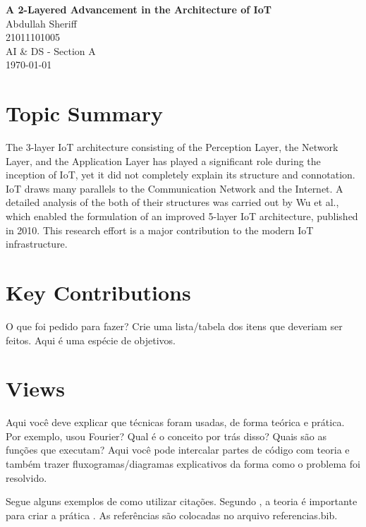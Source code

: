 \documentclass[12pt,a4paper, india]{article}
\begin{document}
\begin{center}
{\textbf {\huge A 2-Layered Advancement in the Architecture of IoT}}\\[5mm]
{\large Abdullah Sheriff} \\[1mm]
{\large 21011101005} \\[1mm]
{\large AI \& DS - Section A} \\[5mm]

\today\\[5mm] %
\end{center}


\section{Topic Summary}

The 3-layer IoT architecture consisting of the Perception Layer, the Network Layer, and the Application Layer has played a significant role during the inception of IoT, yet it did not completely explain its structure and connotation. 
	IoT draws many parallels to the Communication Network and the Internet. A detailed analysis of the both of their structures was carried out by Wu et al., which enabled the formulation of an improved 5-layer IoT architecture, published in 2010.
	This research effort is a major contribution to the modern IoT infrastructure.

\section{Key Contributions}

O que foi pedido para fazer? Crie uma lista/tabela dos itens que deveriam ser feitos. Aqui é uma espécie de objetivos.

\section{Views}

Aqui você deve explicar que técnicas foram usadas, de forma teórica e prática. Por exemplo, usou Fourier? Qual é o conceito por trás disso? Quais são as funções que executam? Aqui você pode intercalar partes de código com teoria e também trazer fluxogramas/diagramas explicativos da forma como o problema foi resolvido. 

Segue alguns exemplos de como utilizar citações. Segundo \textcite{citacao-exemplo}, a teoria é importante para criar a prática \cite{citacao-exemplo}. As referências são colocadas no arquivo referencias.bib. 
\end{document}
